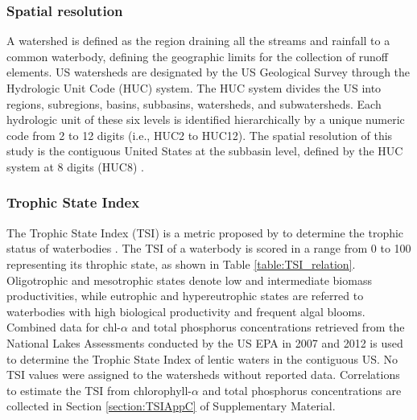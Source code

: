 \begin{refsection}[referencesCh4]
\subsubsection{Spatial resolution}
A watershed is defined as the region draining all the streams and rainfall to a common waterbody, defining the geographic limits for the collection of runoff elements. US watersheds are designated by the US Geological Survey through the Hydrologic Unit Code (HUC) system. The HUC system divides the US into regions, subregions, basins, subbasins, watersheds, and subwatersheds. Each hydrologic unit of these six levels is identified hierarchically by a unique numeric code from 2 to 12 digits (i.e., HUC2 to HUC12).
The spatial resolution of this study is the contiguous United States at the subbasin level, defined by the HUC system at 8 digits (HUC8) \citep{HUC8}.

\subsubsection{Trophic State Index}
The Trophic State Index (TSI) is a metric proposed by \citet{carlson_trophic_1977} to determine the trophic status of waterbodies \citep{QAPP2012}. The TSI of a waterbody is scored in a range from 0 to 100 representing its throphic state, as shown in Table \ref{table:TSI_relation}. Oligotrophic and mesotrophic states denote low and intermediate biomass productivities, while eutrophic and hypereutrophic states are referred to waterbodies with high biological productivity and frequent algal blooms. Combined data for chl-$\alpha$ and total phosphorus concentrations retrieved from the National Lakes Assessments conducted by the US EPA in 2007 and 2012 \citep{NLA2012, NLA2007} is used to determine the Trophic State Index of lentic waters in the contiguous US. No TSI values were assigned to the watersheds without reported data. Correlations to estimate the TSI from chlorophyll-$\alpha$ and total phosphorus concentrations are collected in Section \ref{section:TSIAppC} of Supplementary Material.

\begin{table}[h]
	\centering
	\caption{Relation between TSI value and trophic class.}
	\label{table:TSI_relation}
\end{table}


\end{refsection}
